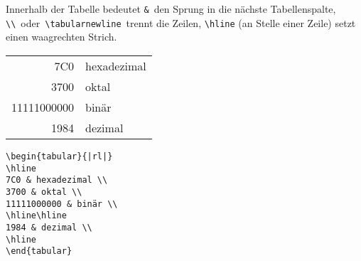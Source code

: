 Innerhalb der Tabelle bedeutet
\lstinline|&|~den Sprung in die nächste Tabellenspalte,
\lstinline|\\|~oder~\lstinline|\tabularnewline|~trennt die Zeilen,
\lstinline|\hline| (an Stelle einer Zeile) setzt einen waagrechten
Strich.
 
          \vspace{0pt plus 1cm}
\exa
\begin{tabular}[t]{|rl|}
\hline
7C0 & hexadezimal \\
3700 & oktal \\
11111000000 & binär \\
\hline\hline
1984 & dezimal \\
\hline
\end{tabular}
\exb
\begin{verbatim}
\begin{tabular}{|rl|}
\hline
7C0 & hexadezimal \\
3700 & oktal \\
11111000000 & binär \\
\hline\hline
1984 & dezimal \\
\hline
\end{tabular}
\end{verbatim}
\exc
 
\endinput
